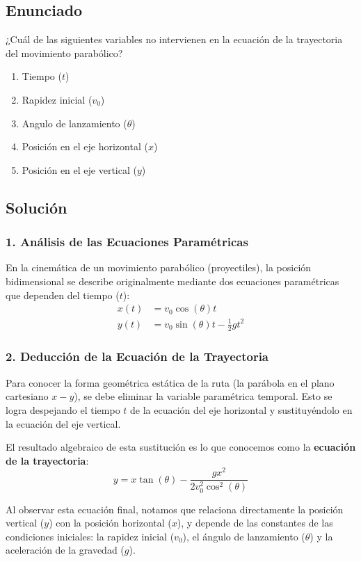 \documentclass[12pt, a4paper]{article}
\begin{document}
\newpage

\subsection*{Enunciado}
¿Cuál de las siguientes variables no intervienen en la ecuación de la trayectoria del movimiento parabólico?

\begin{enumerate}[label=\alph*)]
    \item Tiempo ($t$)
    \item Rapidez inicial ($v_0$)
    \item Angulo de lanzamiento ($\theta$)
    \item Posición en el eje horizontal ($x$)
    \item Posición en el eje vertical ($y$)
\end{enumerate}

\subsection*{Solución}

\subsubsection*{1. Análisis de las Ecuaciones Paramétricas}
En la cinemática de un movimiento parabólico (proyectiles), la posición bidimensional se describe originalmente mediante dos ecuaciones paramétricas que dependen del tiempo ($t$):
\begin{align*}
    x(t) &= v_0 \cos(\theta) t \\
    y(t) &= v_0 \sin(\theta) t - \frac{1}{2}gt^2
\end{align*}

\subsubsection*{2. Deducción de la Ecuación de la Trayectoria}
Para conocer la forma geométrica estática de la ruta (la parábola en el plano cartesiano $x-y$), se debe eliminar la variable paramétrica temporal. Esto se logra despejando el tiempo $t$ de la ecuación del eje horizontal y sustituyéndolo en la ecuación del eje vertical.

El resultado algebraico de esta sustitución es lo que conocemos como la \textbf{ecuación de la trayectoria}:
$$ y = x \tan(\theta) - \frac{g x^2}{2 v_0^2 \cos^2(\theta)} $$

Al observar esta ecuación final, notamos que relaciona directamente la posición vertical ($y$) con la posición horizontal ($x$), y depende de las constantes de las condiciones iniciales: la rapidez inicial ($v_0$), el ángulo de lanzamiento ($\theta$) y la aceleración de la gravedad ($g$). 
\end{document}
